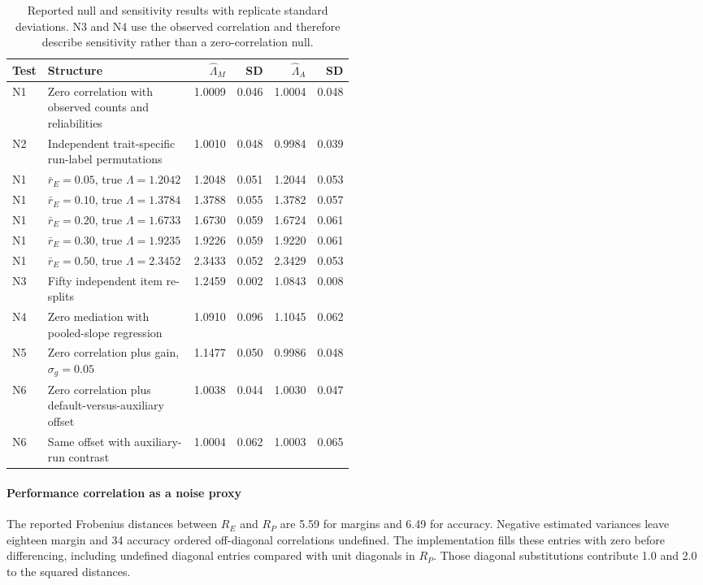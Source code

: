\begin{table}[!htb]
\centering
\caption{Reported null and sensitivity results with replicate standard deviations. N3 and N4 use the observed correlation and therefore describe sensitivity rather than a zero-correlation null.}
\label{tab:original9}
\small\setlength{\tabcolsep}{4pt}\renewcommand{\arraystretch}{1.12}
\begin{tabular}{lL{0.49\linewidth}rrrr}\toprule
Test & Structure & $\widehat\Lambda_M$ & SD & $\widehat\Lambda_A$ & SD\\\midrule
N1 & Zero correlation with observed counts and reliabilities & 1.0009 & 0.046 & 1.0004 & 0.048\\
N2 & Independent trait-specific run-label permutations & 1.0010 & 0.048 & 0.9984 & 0.039\\
N1 & $\bar r_E=0.05$, true $\Lambda=1.2042$ & 1.2048 & 0.051 & 1.2044 & 0.053\\
N1 & $\bar r_E=0.10$, true $\Lambda=1.3784$ & 1.3788 & 0.055 & 1.3782 & 0.057\\
N1 & $\bar r_E=0.20$, true $\Lambda=1.6733$ & 1.6730 & 0.059 & 1.6724 & 0.061\\
N1 & $\bar r_E=0.30$, true $\Lambda=1.9235$ & 1.9226 & 0.059 & 1.9220 & 0.061\\
N1 & $\bar r_E=0.50$, true $\Lambda=2.3452$ & 2.3433 & 0.052 & 2.3429 & 0.053\\
N3 & Fifty independent item re-splits & 1.2459 & 0.002 & 1.0843 & 0.008\\
N4 & Zero mediation with pooled-slope regression & 1.0910 & 0.096 & 1.1045 & 0.062\\
N5 & Zero correlation plus gain, $\sigma_g=0.05$ & 1.1477 & 0.050 & 0.9986 & 0.048\\
N6 & Zero correlation plus default-versus-auxiliary offset & 1.0038 & 0.044 & 1.0030 & 0.047\\
N6 & Same offset with auxiliary-run contrast & 1.0004 & 0.062 & 1.0003 & 0.065\\\bottomrule
\end{tabular}
\end{table}

\paragraph{Performance correlation as a noise proxy}
The reported Frobenius distances between $R_E$ and $R_P$ are 5.59 for margins and 6.49 for accuracy. Negative estimated variances leave eighteen margin and 34 accuracy ordered off-diagonal correlations undefined. The implementation fills these entries with zero before differencing, including undefined diagonal entries compared with unit diagonals in $R_P$. Those diagonal substitutions contribute 1.0 and 2.0 to the squared distances.

